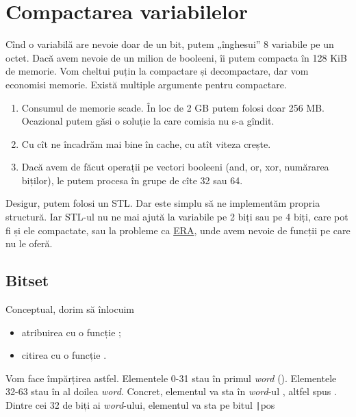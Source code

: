 \documentclass[../main.tex]{subfiles}
\begin{document}
\section{Compactarea variabilelor}

Cînd o variabilă are nevoie doar de un bit, putem „înghesui” 8 variabile pe un octet. Dacă avem nevoie de un milion de booleeni, îi putem compacta în 128 KiB de memorie. Vom cheltui puțin la compactare și decompactare, dar vom economisi memorie. Există multiple argumente pentru compactare.

\begin{enumerate}
  \item Consumul de memorie scade. În loc de 2 GB putem folosi doar 256 MB. Ocazional putem găsi o soluție la care comisia nu s-a gîndit.

  \item Cu cît ne încadrăm mai bine în cache, cu atît viteza crește.

  \item Dacă avem de făcut operații pe vectori booleeni (and, or, xor, numărarea biților), le putem procesa în grupe de cîte 32 sau 64.
\end{enumerate}

Desigur, putem folosi un  STL. Dar este simplu să ne implementăm propria structură. Iar STL-ul nu ne mai ajută la variabile pe 2 biți sau pe 4 biți, care pot fi și ele compactate, sau la probleme ca \href{https://kilonova.ro/problems/4454?list_id=1661}{ERA}, unde avem nevoie de funcții pe care  nu le oferă.

\subsection{Bitset}

Conceptual, dorim să înlocuim

\begin{itemize}
  \item atribuirea  cu o funcție ;
  \item citirea  cu o funcție .
\end{itemize}

Vom face împărțirea astfel. Elementele 0-31 stau în primul \textit{word} (). Elementele 32-63 stau în al doilea \textit{word}. Concret, elementul  va sta în \textit{word}-ul , altfel spus . Dintre cei 32 de biți ai \textit{word}-ului, elementul  va sta pe bitul \texttt|pos %
\end{document}
